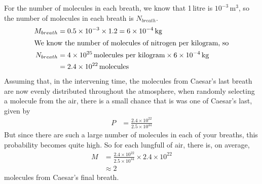 For the number of molecules in each breath, we know that 1\,litre is $10^{-3}$\,m$^3$, so the number of molecules in each breath is $N_{breath}$. 
\begin{align*}
	M_{breath} &= 0.5\times 10^{-3}\times 1.2 = 6\times 10^{-4}\,\text{kg} \\
	\intertext{We know the number of molecules of nitrogen per kilogram, so}
	N_{breath} &= 4\times10^{25}\, \text{molecules per kilogram} \times 6\times 10^{-4}\,\text{kg}\\
	&= 2.4\times10^{22} \,\text{molecules}
\end{align*}
Assuming that, in the intervening time, the molecules from Caesar's last breath are now evenly distributed throughout the atmosphere, when randomly selecting a molecule from the air, there is a small chance that is was one of Caesar's last, given by
\begin{align*}
	P &= \frac{2.4\times10^{22}}{2.5\times10^{44}}
\end{align*}
But since there are such a large number of molecules in each of your breaths, this probability becomes quite high. So for each lungfull of air, there is, on average,
\begin{align*}
	M &= \frac{2.4\times10^{22}}{2.5\times10^{44}} \times 2.4\times10^{22} \\
	&\approx 2
\end{align*}
molecules from Caesar's final breath.
